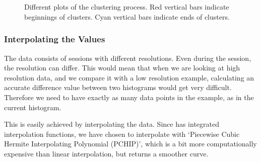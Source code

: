 \begin{figure}
  \centering
   \\
   \\
  \caption{Different plots of the clustering process. Red vertical bars indicate
  beginnings of clusters. Cyan vertical bars indicate ends of clusters.}
  \label{fig:clustering}
\end{figure}

\subsubsection{Interpolating the Values}
The data consists of sessions with different resolutions. Even during the
session, the resolution can differ. This
would mean that when we are looking at high resolution data, and we compare it
with a low resolution example, calculating an accurate difference value between
two histograms would get very difficult. Therefore
we need to have exactly as many data points in the example, as in the current 
histogram. 

This is easily achieved by interpolating the data. Since \matlab has integrated
interpolation functions, we have chosen to interpolate with `Piecewise Cubic
Hermite Interpolating Polynomial (PCHIP)', which is a bit more computationally
expensive than linear interpolation, but returns a smoother curve. 

